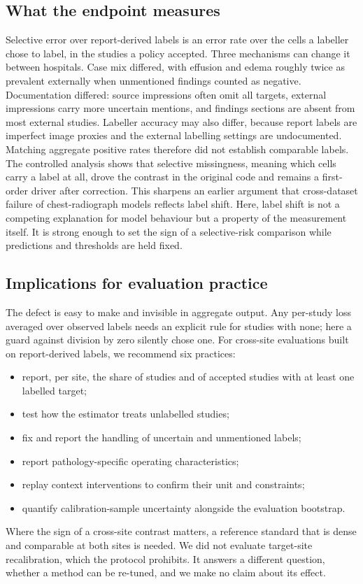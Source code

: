 \subsection*{What the endpoint measures}
Selective error over report-derived labels is an error rate over the cells a
labeller chose to label, in the studies a policy accepted. Three mechanisms can
change it between hospitals. Case mix differed, with effusion and edema roughly
twice as prevalent externally when unmentioned findings counted as negative.
Documentation differed: source impressions often omit all targets, external
impressions carry more uncertain mentions, and findings sections are absent
from most external studies. Labeller accuracy may also differ, because report
labels are imperfect image proxies and the external labelling settings are
undocumented.\cite{jain2021} Matching aggregate positive rates therefore did
not establish comparable labels. The controlled analysis shows that selective
missingness, meaning which cells carry a label at all, drove the contrast in the
original code and remains a first-order driver after correction. This sharpens an
earlier argument that cross-dataset failure of chest-radiograph models reflects
label shift.\cite{cohen2020} Here, label shift is not a competing explanation
for model behaviour but a property of the measurement itself. It is strong
enough to set the sign of a selective-risk comparison while predictions and
thresholds are held fixed.

\subsection*{Implications for evaluation practice}
The defect is easy to make and invisible in aggregate output. Any per-study
loss averaged over observed labels needs an explicit rule for studies with
none; here a guard against division by zero silently chose one. For cross-site
evaluations built on report-derived labels, we recommend six practices:
\begin{itemize}
  \item report, per site, the share of studies and of accepted studies with at
        least one labelled target;
  \item test how the estimator treats unlabelled studies;
  \item fix and report the handling of uncertain and unmentioned labels;
  \item report pathology-specific operating characteristics;
  \item replay context interventions to confirm their unit and constraints;
  \item quantify calibration-sample uncertainty alongside the evaluation
        bootstrap.
\end{itemize}
Where the sign of a cross-site contrast matters, a reference standard that is
dense and comparable at both sites is needed. We did not evaluate target-site
recalibration, which the protocol prohibits. It answers a different question,
whether a method can be re-tuned, and we make no claim about its effect.

